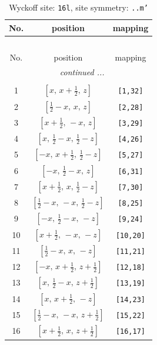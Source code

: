 \documentclass[fleqn,8pt]{jsarticle}
\begin{document}
\renewcommand{\arraystretch}{1.2}
\begin{longtable}{ccc}
\caption{Wyckoff site: {\tt 16l}, site symmetry: {\tt ..m'}}
 \\
 \hline \hline
No. & position & mapping \\ \hline \endfirsthead

\multicolumn{2}{l}{\tablename\ \thetable{}} \\
 \hline \hline
No. & position & mapping \\ \hline \endhead

 \hline \hline
\multicolumn{2}{r}{\footnotesize\it continued ...} \\ \endfoot

 \hline \hline
\multicolumn{2}{r}{} \\ \endlastfoot

1 & $\left[ x,\, x + \frac{1}{2},\, z \right]$ & {\tt [1,32]} \\ \hline
2 & $\left[ \frac{1}{2} - x,\, x,\, z \right]$ & {\tt [2,28]} \\ \hline
3 & $\left[ x + \frac{1}{2},\, - x,\, z \right]$ & {\tt [3,29]} \\ \hline
4 & $\left[ x,\, \frac{1}{2} - x,\, \frac{1}{2} - z \right]$ & {\tt [4,26]} \\ \hline
5 & $\left[ - x,\, x + \frac{1}{2},\, \frac{1}{2} - z \right]$ & {\tt [5,27]} \\ \hline
6 & $\left[ - x,\, \frac{1}{2} - x,\, z \right]$ & {\tt [6,31]} \\ \hline
7 & $\left[ x + \frac{1}{2},\, x,\, \frac{1}{2} - z \right]$ & {\tt [7,30]} \\ \hline
8 & $\left[ \frac{1}{2} - x,\, - x,\, \frac{1}{2} - z \right]$ & {\tt [8,25]} \\ \hline
9 & $\left[ - x,\, \frac{1}{2} - x,\, - z \right]$ & {\tt [9,24]} \\ \hline
10 & $\left[ x + \frac{1}{2},\, - x,\, - z \right]$ & {\tt [10,20]} \\ \hline
11 & $\left[ \frac{1}{2} - x,\, x,\, - z \right]$ & {\tt [11,21]} \\ \hline
12 & $\left[ - x,\, x + \frac{1}{2},\, z + \frac{1}{2} \right]$ & {\tt [12,18]} \\ \hline
13 & $\left[ x,\, \frac{1}{2} - x,\, z + \frac{1}{2} \right]$ & {\tt [13,19]} \\ \hline
14 & $\left[ x,\, x + \frac{1}{2},\, - z \right]$ & {\tt [14,23]} \\ \hline
15 & $\left[ \frac{1}{2} - x,\, - x,\, z + \frac{1}{2} \right]$ & {\tt [15,22]} \\ \hline
16 & $\left[ x + \frac{1}{2},\, x,\, z + \frac{1}{2} \right]$ & {\tt [16,17]} \\
\end{longtable}
\end{document}
